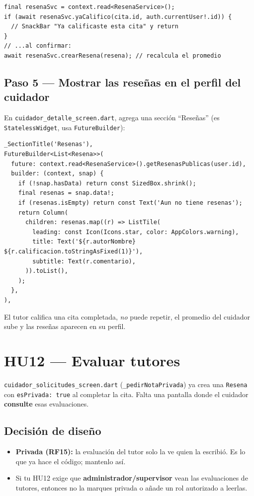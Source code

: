 \documentclass[11pt,a4paper]{article}
\begin{document}
\begin{lstlisting}
final resenaSvc = context.read<ResenaService>();
if (await resenaSvc.yaCalifico(cita.id, auth.currentUser!.id)) {
  // SnackBar "Ya calificaste esta cita" y return
}
// ...al confirmar:
await resenaSvc.crearResena(resena); // recalcula el promedio
\end{lstlisting}

\subsection{Paso 5 — Mostrar las reseñas en el perfil del cuidador}
En \texttt{cuidador\_detalle\_screen.dart}, agrega una sección ``Reseñas''
(es \texttt{StatelessWidget}, usa \texttt{FutureBuilder}):

\begin{lstlisting}
_SectionTitle('Resenas'),
FutureBuilder<List<Resena>>(
  future: context.read<ResenaService>().getResenasPublicas(user.id),
  builder: (context, snap) {
    if (!snap.hasData) return const SizedBox.shrink();
    final resenas = snap.data!;
    if (resenas.isEmpty) return const Text('Aun no tiene resenas');
    return Column(
      children: resenas.map((r) => ListTile(
        leading: const Icon(Icons.star, color: AppColors.warning),
        title: Text('${r.autorNombre}  ${r.calificacion.toStringAsFixed(1)}'),
        subtitle: Text(r.comentario),
      )).toList(),
    );
  },
),
\end{lstlisting}

\begin{listo}
El tutor califica una cita completada, \emph{no} puede repetir, el promedio del
cuidador sube y las reseñas aparecen en su perfil.
\end{listo}

\section{HU12 — Evaluar tutores}

\texttt{cuidador\_solicitudes\_screen.dart} (\texttt{\_pedirNotaPrivada}) ya crea
una \texttt{Resena} con \texttt{esPrivada: true} al completar la cita. Falta una
pantalla donde el cuidador \textbf{consulte} esas evaluaciones.

\subsection{Decisión de diseño}
\begin{itemize}
  \item \textbf{Privada (RF15):} la evaluación del tutor solo la ve quien la
        escribió. Es lo que ya hace el código; mantenlo así.
  \item Si tu HU12 exige que \textbf{administrador/supervisor} vean las
        evaluaciones de tutores, entonces no la marques privada o añade un rol
        autorizado a leerlas.
\end{itemize}
\end{document}
